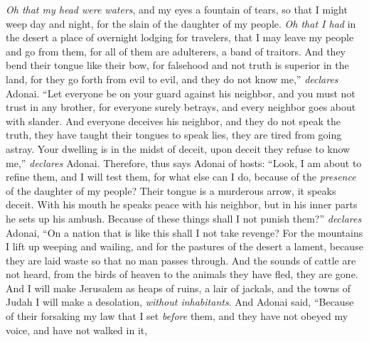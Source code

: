 \begin{biblechapter} %
\verse {} \textit{Oh that my head were waters}, 
and my eyes a fountain of tears, 
so that I might weep day and night, 
for the slain of the daughter of my people.
\verse \textit{Oh that I had} in the desert a place of overnight lodging for travelers, 
that I may leave my people and go from them, 
for all of them are adulterers, 
a band of traitors.
\verse And they bend their tongue like their bow, 
for falsehood and not truth is superior in the land, 
for they go forth from evil to evil, 
and they do not know me,” \textit{declares} Adonai.
 “Let everyone be on your guard against his neighbor, 
and you must not trust in any brother, 
for everyone surely betrays, 
and every neighbor goes about with slander.
\verse And everyone deceives his neighbor, 
and they do not speak the truth, 
they have taught their tongues to speak lies, 
they are tired from going astray.
\verse Your dwelling is in the midst of deceit, 
upon deceit they refuse to know me,” \textit{declares} Adonai.
\verse Therefore, thus says Adonai of hosts:
\verse “Look, I am about to refine them, 
and I will test them, 
for what else can I do, 
because of the \textit{presence} of the daughter of my people?
\verse Their tongue is a murderous arrow, 
it speaks deceit. 
With his mouth he speaks peace with his neighbor, 
but in his inner parts he sets up his ambush.
\verse Because of these things shall I not punish them?” \textit{declares} Adonai, 
“On a nation that is like this shall I not take revenge?
\verse For the mountains I lift up weeping and wailing, 
and for the pastures of the desert a lament, 
because they are laid waste so that no man passes through. 
And the sounds of cattle are not heard, 
from the birds of heaven to the animals 
they have fled, they are gone.
\verse And I will make Jerusalem as heaps of ruins, a lair of jackals, 
and the towns of Judah I will make a desolation, \textit{without inhabitants}.
 And Adonai said, “Because of their forsaking my law that I set \textit{before} them, and they have not obeyed my voice, and have not walked in it,

\end{biblechapter}
